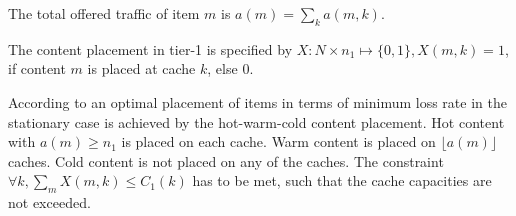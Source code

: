 The total offered traffic of item $m$ is $a(m) = \sum_k a(m,k)$.


The content placement in tier-1 is specified by $X: N \times n_1\mapsto \{0,1\}, X(m,k) = 1$, if content $m$ is placed at cache $k$, else $0$.

According to \cite{valancius2009greening} an optimal placement of items in terms of minimum loss rate in the stationary case is achieved by the hot-warm-cold content placement.
Hot content with $a(m)\geq n_1$ is placed on each cache.
Warm content is placed on $\lfloor a(m) \rfloor$ caches.
Cold content is not placed on any of the caches.
The constraint  $\forall k, \sum_m X(m,k)\leq C_1(k)$ has to be met, such that the cache capacities are not exceeded.

%




%

